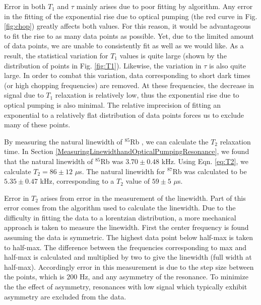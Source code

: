 Error in both $T_1$ and $\tau$ mainly arises due to poor fitting by algorithm.  Any error in the fitting of the exponential rise due to optical pumping (the red curve in Fig. \ref{fig:chop}) greatly affects both values.  For this reason, it would be advantageous to fit the rise to as many data points as possible. Yet, due to the limited amount of data points, we are unable to consistently fit as well as we would like.  As a result, the statistical variation for $T_1$ values is quite large (shown by the distribution of points in Fig. \ref{fig:T1}). Likewise, the variation in $\tau$ is also quite large.  In order to combat this variation, data corresponding to short dark times (or high chopping frequencies) are removed.  At these frequencies, the decrease in signal due to $T_1$ relaxation is relatively low, thus the exponential rise due to optical pumping is also minimal.  The relative imprecision of fitting an exponential to a relatively flat distribution of data points forces us to exclude many of these points.


By measuring the natural linewidth of $^{85}$Rb , we can calculate the $T_2$ relaxation time.  In Section \ref{MeasuringLinewidthandOpticalPumpingResonance}, we found that the natural linewidth of $^{85}$Rb was $3.70 \pm 0.48$ kHz.  Using Eqn. \ref{eq:T2}, we calculate $T_2 = 86 \pm 12$ $\mu$s. The natural linewidth for $^{87}$Rb was calculated to be $5.35 \pm 0.47$ kHz, corresponding to a $T_2$ value of  $59 \pm 5$ $\mu$s.

Error in $T_2$ arises from error in the measurement of the linewidth. Part of this error comes from the algorithm used to calculate the linewidth.  Due to the difficulty in fitting the data to a lorentzian distribution, a more mechanical approach is taken to measure the linewidth. First the center frequency is found assuming  the data is symmetric. The highest data point below half-max is taken to half-max.  The difference between the frequencies corresponding to max and half-max is calculated and multiplied by two to give the linewidth (full width at half-max).  Accordingly error in this measurement is due to the step size between the points, which is $200$ Hz, and  any asymmetry of the resonance.  To minimize the the effect of asymmetry, resonances with low signal which typically exhibit asymmetry are excluded from the data. 

